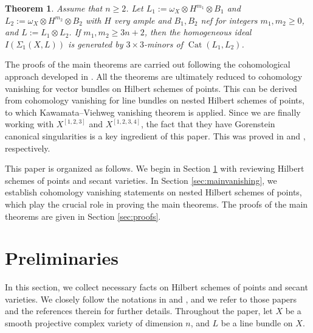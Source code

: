 \documentclass{amsart}
\theoremstyle{plain}
\newtheorem{thm}{Theorem}[section]
\theoremstyle{definition}
\theoremstyle{remark}
\begin{document}
\begin{thm}\label{thm:main3}
Assume that $n \geq 2$. Let $L_1:=\omega_X \otimes H^{m_1} \otimes B_1$ and $L_2:=\omega_X \otimes H^{m_2} \otimes B_2$ with $H$ very ample and $B_1, B_2$ nef for integers $m_1, m_2 \geq 0$, and $L:=L_1 \otimes L_2$. 
If $m_1, m_2 \geq 3n+2$, then the homogeneous ideal $I(\Sigma_1(X, L))$ is generated by $3 \times 3$-minors of $\operatorname{Cat}(L_1, L_2)$. 
\end{thm}

The proofs of the main theorems are carried out following the cohomological approach developed in \cite{Agostini.Park.25, Choi.Lacini.Park.Sheridan.25, Ein.Niu.Park.20}. All the theorems are ultimately reduced to cohomology vanishing for vector bundles on Hilbert schemes of points. This can be derived from cohomology vanishing for line bundles on nested Hilbert schemes of points, to which Kawamata--Viehweg vanishing theorem is applied. Since we are finally working with $X^{[1,2,3]}$ and $X^{[1,2,3,4]}$, the fact that they have Gorenstein canonical singularities is a key ingredient of this paper. This was proved in \cite[Lemma 4.20]{Choi.Lacini.Park.Sheridan.25} and \cite[Corollary 4.3]{Choi.25}, respectively.

\medskip

This paper is organized as follows. We begin in Section \ref{sec:prelim} with reviewing Hilbert schemes of points and secant varieties. In Section \ref{sec:mainvanishing}, we establish cohomology vanishing statements on nested Hilbert schemes of points, which play the crucial role in proving the main theorems. The proofs of the main theorems are given in Section \ref{sec:proofs}. 




\section{Preliminaries}\label{sec:prelim}
\noindent In this section, we collect necessary facts on Hilbert schemes of points and secant varieties. We closely follow the notations in \cite{Choi.Lacini.Park.Sheridan.25} and \cite{Choi.Park.26}, and we refer to those papers and the references therein for further details. Throughout the paper, let $X$ be a smooth projective complex variety of dimension $n$, and $L$ be a line bundle on $X$.
\end{document}
